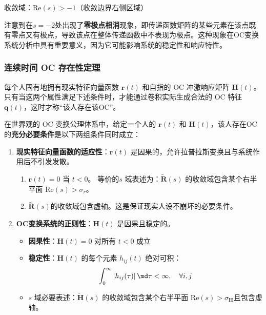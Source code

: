 收敛域：$\mathrm{Re}(s) > -1$（收敛边界右侧区域）

注意到在\(s = -2\)处出现了\textbf{零极点相消}现象，即传递函数矩阵的某些元素在该点既有零点又有极点，导致该点在整体传递函数中不表现为极点。这种现象在OC变换系统分析中具有重要意义，因为它可能影响系统的稳定性和响应特性。

\subsubsection{连续时间 OC 存在性定理}

每个人固有地拥有现实特征向量函数 $\mathbf{r}(t)$ 和自指的 OC 冲激响应矩阵 $\mathbf{H}(t)$。只有当这两个属性满足下述条件时，才能通过卷积实际生成合法的 OC 特征 $\mathbf{q}(t)$，这时才称“该人存在该OC”。

\begin{theorem}
    在\wkn{}世界观的 OC 变换公理体系中，给定一个人的 $\mathbf{r}(t)$ 和 $\mathbf{H}(t)$，该人存在OC的\textbf{充分必要条件}是以下两组条件同时成立：
    \begin{enumerate}
        \item \textbf{现实特征向量函数的适应性}：$\mathbf{r}(t)$ 是因果的，允许拉普拉斯变换且与系统作用后不引发发散。
              \begin{enumerate}
                  \item $\mathbf{r}(t)=0$ 当 $t<0$。
                        等价的\(s\) 域表述为：$\tilde{\mathbf{R}}(s)$ 的收敛域包含某个右半平面 $\mathrm{Re}(s)>\sigma_r$。
                  \item \(\tilde{\mathbf{R}}(s)\)的收敛域包含虚轴。这是保证现实人设不崩坏的必要条件。
              \end{enumerate}
        \item \textbf{OC变换系统的正则性}：$\mathbf{H}(t)$ 是因果且稳定的。
              \begin{itemize}
                  \item \textbf{因果性}：$\mathbf{H}(t) = 0$ 对所有 $t < 0$ 成立
                  \item \textbf{稳定性}：$\mathbf{H}(t)$ 的每个元素 $h_{ij}(t)$ 绝对可积：
                        \begin{equation}
                            \int_0^\infty |h_{ij}(\tau)| \, \md\tau < \infty, \quad \forall i,j
                        \end{equation}
                  \item \(s\) 域必要表述：$\tilde{\mathbf{H}}(s)$ 的收敛域包含某个右半平面 $\mathrm{Re}(s)>\sigma_{\mathbf{H}}$且包含虚轴。
              \end{itemize}
    \end{enumerate}
\end{theorem}

